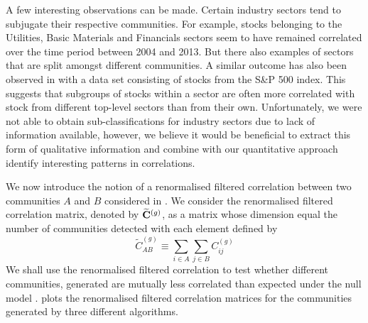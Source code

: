 A few interesting observations can be made.
Certain industry sectors tend to subjugate their respective communities.
For example, stocks belonging to the Utilities, Basic Materials and Financials sectors seem to have remained correlated over the time period between 2004 and 2013.
But there also examples of sectors that are split amongst different communities.
A similar outcome has also been observed in \cite{MG13} with a data set consisting of stocks from the S\&P 500 index.
This suggests that subgroups of stocks within a sector are often more correlated with stock from different top-level sectors than from their own.
Unfortunately, we were not able to obtain sub-classifications for industry sectors due to lack of information available, however, we believe it would be beneficial to extract this form of qualitative information and combine with our quantitative approach identify interesting patterns in correlations.

We now introduce the notion of a renormalised filtered correlation between two communities $A$ and $B$ considered in \cite{MG13}.
We consider the renormalised filtered correlation matrix, denoted by $\widetilde{\mathbf C}^{(g)}$, as a matrix whose dimension equal the number of communities detected with each element defined by
\begin{equation}
\label{eq:renormalisedFilteredCorrelationMatrix}
	\widetilde{C}^{(g)}_{AB} \equiv \sum_{i \in A} \sum_{j \in B} C^{(g)}_{ij}
\end{equation}
We shall use the renormalised filtered correlation to test whether different communities, generated are mutually less correlated than expected under the null model \cite{MG13}.
 plots the renormalised filtered correlation matrices for the communities generated by three different algorithms.

